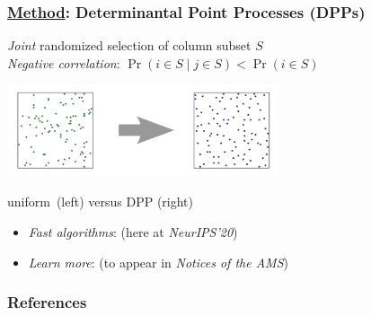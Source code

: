 \message{ !name(nystrom-press.tex)}\documentclass[10pt,handout]{beamer}
\begin{document}
\begin{frame}
  \frametitle{\underline{Method}: Determinantal Point Processes (DPPs)}
\onslide<+->
  \emph{Joint} randomized selection of column subset $S$\\[2mm]

  \onslide<+->
  \emph{Negative correlation}: $\Pr(i\in S\mid j\in S) < \Pr(i\in S)$
  \vspace{-2mm}
  
\begin{center}
  \includegraphics[width=0.6\textwidth]{../figs/gue.png}
  \vspace{-3mm}
  
  \small  uniform~(left) versus DPP (right)%
\end{center}
\vspace{-2mm}
\begin{itemize}
  \item \onslide<+->\emph{Fast algorithms}: \cite{alpha-dpp} (here at
    \textit{NeurIPS'20})\\[-1mm]
  \item \onslide<+->\emph{Learn more}: \cite{dpps-in-randnla}
    (to appear in \textit{Notices of the AMS})\\[-1mm]
\end{itemize}
\let\thefootnote\relax{}  
  \end{frame}


\begin{frame}[allowframebreaks]
  \frametitle{References}
  \tiny
  
  
\end{frame}

\end{document}
